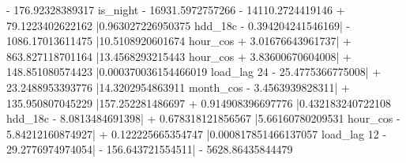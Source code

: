 - 176.92328389317 is_{night} - 16931.5972757266  - 14110.2724419146  + 79.1223402622162 \left|{0.963027226950375 hdd_{18c} - 0.394204241546169}\right| - 1086.17013611475 \left|{10.5108920601674 hour_{cos} + 3.01676643961737}\right| + 863.827118701164 \left|{13.4568293215443 hour_{cos} + 3.83600670604008}\right| + 148.851080574423 \left|{0.000370036154466019 load_{lag 24} - 25.4775366775008}\right| + 23.2488953393776 \left|{14.3202954863911 month_{cos} - 3.4563939828311}\right| + 135.950807045229 \left|{157.252281486697  + 0.914908396697776 \left|{0.432183240722108 hdd_{18c} - 8.0813484691398}\right| + 0.678318121856567 \left|{5.66160780209531 hour_{cos} - 5.84212160874927}\right| + 0.122225665354747 \left|{0.000817851466137057 load_{lag 12} - 29.2776974974054}\right| - 156.643721554511}\right| - 5628.86435844479